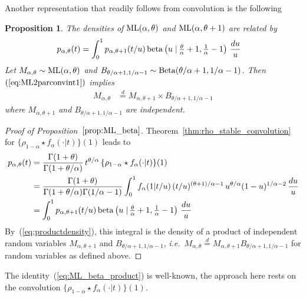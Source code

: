 \documentclass[a4paper,12pt]{article}
\newtheorem{proposition}{Proposition}
\begin{document}
{{Another representation that readily follows from convolution is the following 
\begin{proposition}
\label{prop:ML_beta}
The densities  of ${\rm ML}(\alpha,\theta)$  and ${\rm ML}(\alpha,\theta+1)$   are related by
\begin{align}
p_{\alpha,\theta}(t) 
&=  \int_0^1 p_{\alpha,\theta+1}(t/u) \, {\rm beta}\left(u \left.\right\vert \tfrac{\theta}{\alpha}+1,\tfrac{1}{\alpha}-1\right) \,\frac{du}{u} 
\label{eq:ML2parconvint1}
\end{align}
Let  $M_{\alpha,\theta} \sim {\rm ML}(\alpha,\theta)$ and $B_{\theta/\alpha+1,1/\alpha-1} \sim {\rm Beta}(\theta/\alpha+1,1/\alpha-1)$.
Then~$(\ref{eq:ML2parconvint1})$ implies
\begin{align}
M_{\alpha,\theta} &\overset{d}{=} M_{\alpha,\theta+1} \times  B_{\theta/\alpha+1,1/\alpha-1}
\label{eq:ML_beta_product}
\end{align}
where $M_{\alpha,\theta+1}$ and  $B_{\theta/\alpha+1,1/\alpha-1}$ are independent.
\end{proposition}

\begin{proof}[Proof of Proposition~$\ref{prop:ML_beta}$]
\label{proof:ML_beta}
Theorem~\ref{thm:rho_stable_convolution} for  $\{\rho_{1-\alpha}\star f_\alpha(\cdot\vert t) \}(1)$ leads to
\begin{align*} 
p_{\alpha,\theta}(t) 
&= \frac{\Gamma(1+\theta)}{\Gamma(1+\theta/\alpha)} \,  t^{\theta/\alpha} \, \{\rho_{1-\alpha}\star f_\alpha(\cdot\vert t) \}(1) \\
&=  \frac{\Gamma(1+\theta)}{\Gamma(1+\theta/\alpha)\Gamma(1/\alpha-1)} 
 \int_0^1 f_\alpha(1 \vert t/u) \, (t/u)^{(\theta+1)/\alpha-1} \, u^{\theta/\alpha} (1-u)^{1/\alpha-2}  \, \frac{du}{u} 
\\
&=  \int_0^1 p_{\alpha,\theta+1}(t/u) \, {\rm beta}\left(u \left.\right\vert \tfrac{\theta}{\alpha}+1,\tfrac{1}{\alpha}-1\right) \,\frac{du}{u} 
\end{align*}
By~(\ref{eq:productdensity}), this integral  is the density of a product %
of  independent random variables $M_{\alpha,\theta+1}$ and  $B_{\theta/\alpha+1,1/\alpha-1}$, 
{\it i.e.}\ $M_{\alpha,\theta} \overset{d}{=}  M_{\alpha,\theta+1}  B_{\theta/\alpha+1,1/\alpha-1}$
for random variables as defined above.
\end{proof}
The identity~(\ref{eq:ML_beta_product}) is well-known, the approach here rests on the convolution $\{\rho_{1-\alpha}\star f_\alpha(\cdot\vert t) \}(1)$. 

}}
\end{document}

